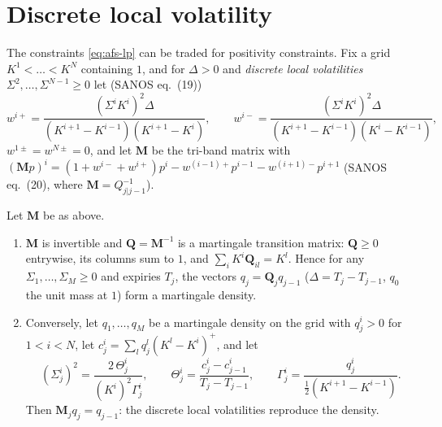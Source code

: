 
\section{Discrete local volatility}\label{sec:afs-dlv}

The constraints \eqref{eq:afs-lp} can be traded for positivity constraints. Fix a grid $K^1<\dots<K^N$ containing $1$, and
for $\Delta>0$ and \emph{discrete local volatilities} $\Sigma^2,\dots,\Sigma^{N-1}\ge0$ let (SANOS eq.~(19))
\begin{equation}\label{eq:afs-dlv-weights}
  w^{i+}=\frac{(\Sigma^iK^i)^2\Delta}{(K^{i+1}-K^{i-1})(K^{i+1}-K^i)},\qquad
  w^{i-}=\frac{(\Sigma^iK^i)^2\Delta}{(K^{i+1}-K^{i-1})(K^i-K^{i-1})},
\end{equation}
$w^{1\pm}=w^{N\pm}=0$, and let $\mathbf M$ be the tri-band matrix with
$(\mathbf Mp)^i=(1+w^{i-}+w^{i+})p^i-w^{(i-1)+}p^{i-1}-w^{(i+1)-}p^{i+1}$ (SANOS eq.~(20), where $\mathbf M=Q_{j|j-1}^{-1}$).

\begin{proposition}\label{prop:afs-dlv}
Let $\mathbf M$ be as above.
\begin{enumerate}[label=(\roman*)]
  \item $\mathbf M$ is invertible and $\mathbf Q=\mathbf M^{-1}$ is a martingale transition matrix: $\mathbf Q\ge0$ entrywise, its columns sum to
    $1$, and $\sum_iK^i\mathbf Q_{il}=K^l$. Hence for any $\Sigma_1,\dots,\Sigma_M\ge0$ and expiries $T_j$, the vectors $q_j=\mathbf Q_jq_{j-1}$
    ($\Delta=T_j-T_{j-1}$, $q_0$ the unit mass at $1$) form a martingale density.
  \item Conversely, let $q_1,\dots,q_M$ be a martingale density on the grid with $q_j^i>0$ for $1<i<N$, let
    $c_j^i=\sum_lq_j^l(K^l-K^i)^+$, and let
    \begin{equation}\label{eq:afs-implied-dlv}
      (\Sigma_j^i)^2=\frac{2\,\Theta_j^i}{(K^i)^2\Gamma_j^i},\qquad\Theta_j^i=\frac{c_j^i-c_{j-1}^i}{T_j-T_{j-1}},\qquad
      \Gamma_j^i=\frac{q_j^i}{\frac12(K^{i+1}-K^{i-1})} .
    \end{equation}
    Then $\mathbf M_jq_j=q_{j-1}$: the discrete local volatilities reproduce the density.
\end{enumerate}
\end{proposition}

